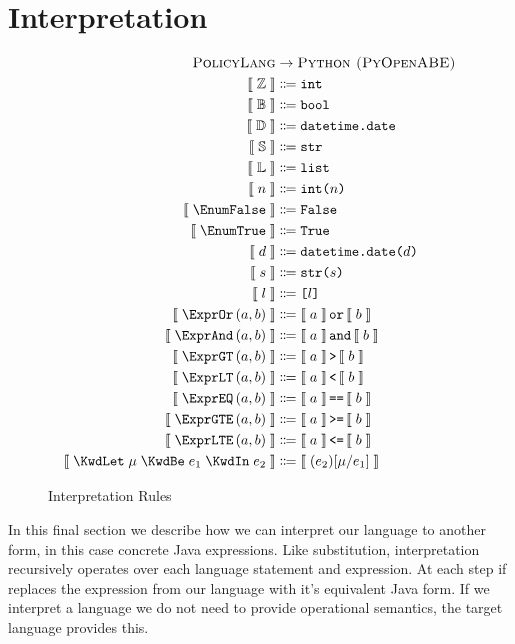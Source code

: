 \section{Interpretation}\label{sec:interpretation}

\begin{figure}[ht]
  \centering
\begin{align*}
  \textsc{PolicyLang}&\rightarrow\textsc{Python (PyOpenABE)}\\
  \interpB{\TyInt}&\Coloneqq\text{\ttfamily int}\\
  \interpB{\mathbb{B}}&\Coloneqq\text{\ttfamily bool}\\
  \interpB{\mathbb{D}}&\Coloneqq\text{\ttfamily datetime.date}\\
  \interpB{\mathbb{S}}&\Coloneqq\text{\ttfamily str}\\
  \interpB{\mathbb{L}}&\Coloneqq\text{\ttfamily list}\\
  \interpB{n}&\Coloneqq\text{\ttfamily int(}n\text{\ttfamily)}\\
  \interpB{\EnumFalse}&\Coloneqq\text{\ttfamily False}\\
  \interpB{\EnumTrue} &\Coloneqq\text{\ttfamily True}\\
  \interpB{d}&\Coloneqq\text{\ttfamily datetime.date(}d\text{\ttfamily)}\\
  \interpB{s}&\Coloneqq\text{\ttfamily str(}s\text{\ttfamily)}\\
  \interpB{l}&\Coloneqq\text{\ttfamily [}l\text{\ttfamily]}\\
  \interpB{\exprOr{a}{b}}  &\Coloneqq\interpB{a}\,\text{\ttfamily or}\,\interpB{b}\\
  \interpB{\exprAnd{a}{b}} &\Coloneqq\interpB{a}\,\text{\ttfamily and}\,\interpB{b}\\
  \interpB{\exprGT{a}{b}}  &\Coloneqq\interpB{a}\,\text{\ttfamily \textgreater}\,\interpB{b}\\
  \interpB{\exprLT{a}{b}}  &\Coloneqq\interpB{a}\,\text{\ttfamily \textless}\,\interpB{b}\\
  \interpB{\exprEQ{a}{b}}  &\Coloneqq\interpB{a}\,\text{\ttfamily ==}\,\interpB{b}\\
  \interpB{\exprGTE{a}{b}}  &\Coloneqq\interpB{a}\,\text{\ttfamily \textgreater =}\,\interpB{b}\\
  \interpB{\exprLTE{a}{b}}  &\Coloneqq\interpB{a}\,\text{\ttfamily \textless =}\,\interpB{b}\\
  \interpB{\stmtLet{\mu}{e_1}{e_2}}&\Coloneqq\interpB{\subst{e_{2}}{\mu}{e_{1}}}
\end{align*}
  \caption{\label{fig:interp}Interpretation Rules}
\end{figure}

In this final section we describe how we can interpret our language to another form, in this case concrete Java expressions.
Like substitution, interpretation recursively operates over each language statement and expression.
At each step if replaces the expression from our language with it's equivalent Java form.
If we interpret a language we do not need to provide operational semantics, the target language provides this.
